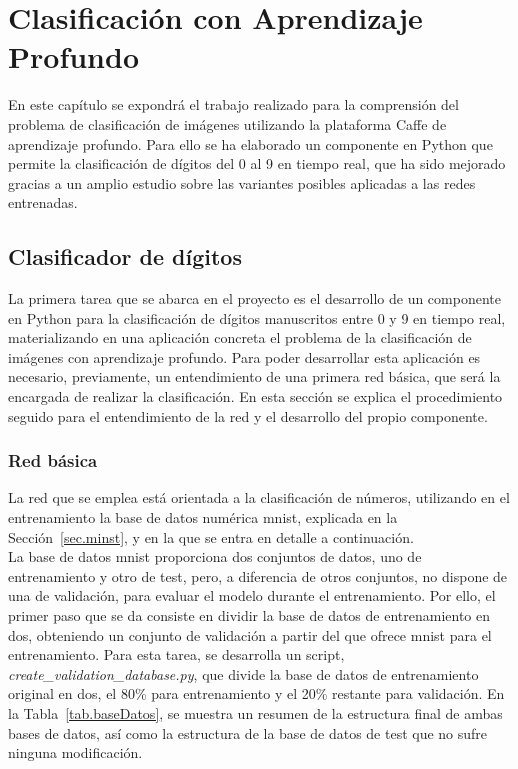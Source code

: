 \chapter{Clasificación con Aprendizaje Profundo}\label{cap.clasificacion}
En este capítulo se expondrá el trabajo realizado para la comprensión del problema de clasificación de imágenes utilizando la plataforma Caffe de aprendizaje profundo. Para ello se ha elaborado un componente en Python que permite la clasificación de dígitos del 0 al 9 en tiempo real, que ha sido mejorado gracias a un amplio estudio sobre las variantes posibles aplicadas a las redes entrenadas.

\section{Clasificador de dígitos}
La primera tarea que se abarca en el proyecto es el desarrollo de un componente en Python para la clasificación de dígitos manuscritos entre 0 y 9 en tiempo real, materializando en una aplicación concreta el problema de la clasificación de imágenes con aprendizaje profundo. Para poder desarrollar esta aplicación es necesario, previamente, un entendimiento de una primera red básica, que será la encargada de realizar la clasificación. En esta sección se explica el procedimiento seguido para el entendimiento de la red y el desarrollo del propio componente.

\subsection{Red básica}\label{sec.red}
La red que se emplea está orientada a la clasificación de números, utilizando en el entrenamiento la base de datos numérica \acrshort{mnist}, explicada en la Sección~\ref{sec.minst}, y en la que se entra en detalle a continuación.\\

La base de datos \acrshort{mnist} proporciona dos conjuntos de datos, uno de entrenamiento y otro de test, pero, a diferencia de otros conjuntos, no dispone de una de validación, para evaluar el modelo durante el entrenamiento. Por ello, el primer paso que se da consiste en dividir la base de datos de entrenamiento en dos, obteniendo un conjunto de validación a partir del que ofrece \acrshort{mnist} para el entrenamiento. Para esta tarea, se desarrolla un script, \textit{create\_validation\_database.py}, que divide la base de datos de entrenamiento original en dos, el 80\% para entrenamiento y el 20\% restante para validación. En la Tabla~\ref{tab.baseDatos}, se muestra un resumen de la estructura final de ambas bases de datos, así como la estructura de la base de datos de test que no sufre ninguna modificación.\\

